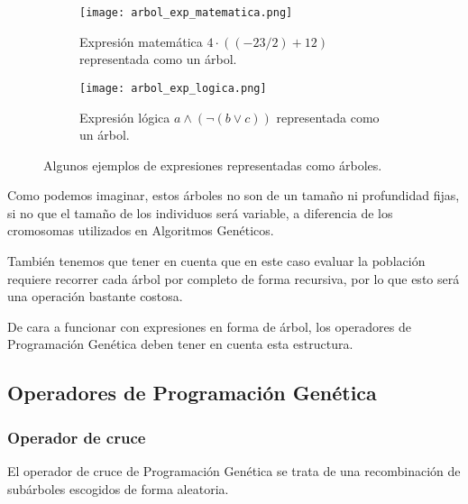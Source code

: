 \begin{figure}[H]
    \centering
	 \begin{subfigure}[b]{0.49\textwidth}
		 \centering
		 \texttt{[image: arbol\_exp\_matematica.png]}
		 \caption{Expresión matemática $4 \cdot ( (-23 / 2) + 12)$ representada como un árbol.}
		 \label{fig:exp_matematica}
	 \end{subfigure}
	 \begin{subfigure}[b]{0.49\textwidth}
		 \centering
		\texttt{[image: arbol\_exp\_logica.png]}
		\caption{Expresión lógica $ a \wedge (\neg (b \vee c) ) $ representada como un árbol.}
		\label{fig:exp_logica}
   \end{subfigure}
	\caption{Algunos ejemplos de expresiones representadas como árboles.}
	\label{fig:arbol_exp}
\end{figure}

Como podemos imaginar, estos árboles no son de un tamaño ni profundidad fijas, si no que el tamaño de los individuos será variable, a diferencia de los cromosomas utilizados en Algoritmos Genéticos.

También tenemos que tener en cuenta que en este caso evaluar la población requiere recorrer cada árbol por completo de forma recursiva, por lo que esto será una operación bastante costosa.

De cara a funcionar con expresiones en forma de árbol, los operadores de Programación Genética deben tener en cuenta esta estructura.

\subsection{Operadores de Programación Genética}

\subsubsection{Operador de cruce}

El operador de cruce de Programación Genética se trata de una recombinación de subárboles escogidos de forma aleatoria.

